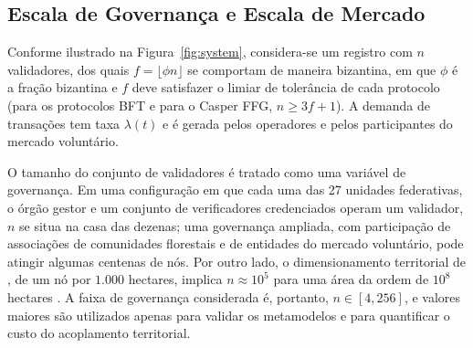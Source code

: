 \subsection{Escala de Governança e Escala de Mercado}

Conforme ilustrado na Figura~\ref{fig:system}, considera-se um registro com $n$ validadores, dos quais $f = \lfloor \phi n \rfloor$ se comportam de maneira bizantina, em que $\phi$ é a fração bizantina e $f$ deve satisfazer o limiar de tolerância de cada protocolo (para os protocolos BFT e para o Casper FFG, $n \geq 3f+1$). A demanda de transações tem taxa $\lambda(t)$ e é gerada pelos operadores e pelos participantes do mercado voluntário.

O tamanho do conjunto de validadores é tratado como uma variável de governança. Em uma configuração em que cada uma das 27 unidades federativas, o órgão gestor e um conjunto de verificadores credenciados operam um validador, $n$ se situa na casa das dezenas; uma governança ampliada, com participação de associações de comunidades florestais e de entidades do mercado voluntário, pode atingir algumas centenas de nós. Por outro lado, o dimensionamento territorial de \citep{Caburlao2026clei}, de um nó por $1.000$ hectares, implica $n \approx 10^{5}$ para uma área da ordem de $10^{8}$ hectares . A faixa de governança considerada é, portanto, $n \in [4, 256]$, e valores maiores são utilizados apenas para validar os metamodelos e para quantificar o custo do acoplamento territorial.

